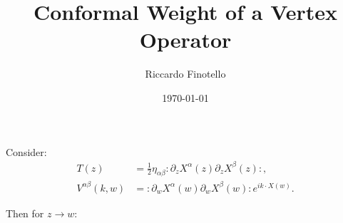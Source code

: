\documentclass[10pt,a4paper]{article}
\author{Riccardo Finotello}
\title{Conformal Weight of a Vertex Operator}
\date{\today}
\begin{document}

    \maketitle

    Consider:
    \begin{align*}
        T\left( z \right) &= \frac{1}{2} \eta_{\alpha\beta} \colon \partial_z
        X^{\alpha}\left( z \right) \partial_z X^{\beta}\left( z \right) \colon,
        \\
        V^{\alpha\beta}\left( k, w \right) &= \colon \partial_w
        X^{\alpha}\left( w \right) \partial_w X^{\beta}\left( w \right) \colon e^{i k
        \cdot X\left( w \right)}.
    \end{align*}

    Then for $z \to w$:
\end{document}
